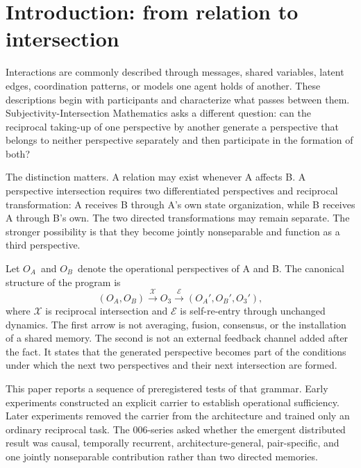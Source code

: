 \documentclass[11pt,a4paper]{article}
\newcommand{\OA}{\ensuremath{O_{A}}}
\newcommand{\OB}{\ensuremath{O_{B}}}
\newcommand{\Othree}{\ensuremath{O_{3}}}
\begin{document}
\vspace{1.2em}
{\small
\setlength{\parskip}{0pt}
\tableofcontents
}
\clearpage

\section{Introduction: from relation to intersection}

Interactions are commonly described through messages, shared variables, latent edges, coordination patterns, or models one agent holds of another. These descriptions begin with participants and characterize what passes between them. Subjectivity-Intersection Mathematics asks a different question: can the reciprocal taking-up of one perspective by another generate a perspective that belongs to neither perspective separately and then participate in the formation of both?

The distinction matters. A relation may exist whenever A affects B. A perspective intersection requires two differentiated perspectives and reciprocal transformation: A receives B through A's own state organization, while B receives A through B's own. The two directed transformations may remain separate. The stronger possibility is that they become jointly nonseparable and function as a third perspective.

Let \OA\ and \OB\ denote the operational perspectives of A and B. The canonical structure of the program is
\begin{equation}
 (\OA,\OB)
 \xrightarrow{\mathcal X}
 \Othree
 \xrightarrow{\mathcal E}
 (\OA',\OB',\Othree'),
 \label{eq:canonical}
\end{equation}
where $\mathcal X$ is reciprocal intersection and $\mathcal E$ is self-re-entry through unchanged dynamics. The first arrow is not averaging, fusion, consensus, or the installation of a shared memory. The second is not an external feedback channel added after the fact. It states that the generated perspective becomes part of the conditions under which the next two perspectives and their next intersection are formed.

This paper reports a sequence of preregistered tests of that grammar. Early experiments constructed an explicit carrier to establish operational sufficiency. Later experiments removed the carrier from the architecture and trained only an ordinary reciprocal task. The 006-series asked whether the emergent distributed result was causal, temporally recurrent, architecture-general, pair-specific, and one jointly nonseparable contribution rather than two directed memories.
\end{document}
